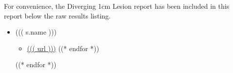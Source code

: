 \documentclass[12pt]{article}
\begin{document}
For convenience, the Diverging 1cm Lesion report has been included in this report below the raw results listing.

\begin{itemize}
((* for s in simulations *))
	\item ((( s.name )))
\begin{itemize}
	((* for url in s.urls *))
	\item \url{((( url )))}
	((* endfor *))
\end{itemize}
((* endfor *))
\end{itemize}


\end{document}
